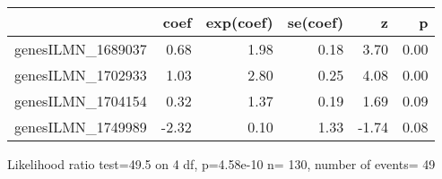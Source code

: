 \begin{table}[ht]
\centering
\begin{tabular}{rrrrrr}
  \hline
 & coef & exp(coef) & se(coef) & z & p \\ 
  \hline
genesILMN\_1689037 & 0.68 & 1.98 & 0.18 & 3.70 & 0.00 \\ 
  genesILMN\_1702933 & 1.03 & 2.80 & 0.25 & 4.08 & 0.00 \\ 
  genesILMN\_1704154 & 0.32 & 1.37 & 0.19 & 1.69 & 0.09 \\ 
  genesILMN\_1749989 & -2.32 & 0.10 & 1.33 & -1.74 & 0.08 \\ 
   \hline
\end{tabular}
\end{table}
\wl
\tiny Likelihood ratio test=49.5  on 4 df, p=4.58e-10  n= 130, number of events= 49


